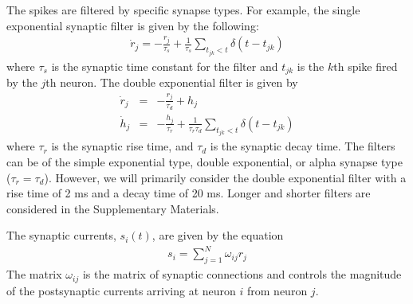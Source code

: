 \documentclass[11pt]{article} %
\begin{document}
The spikes are filtered by specific synapse types.  For example, the single exponential synaptic filter is given by the following:
\begin{eqnarray}
\dot{r}_j = -\frac{r_j}{\tau_s} + \frac{1}{\tau_s}\sum_{t_{jk}<t}\delta(t-t_{jk})  \label{fr11}
\end{eqnarray}
where $\tau_s$ is the synaptic time constant for the filter and $t_{jk}$ is the $k$th spike fired by the $j$th neuron.  The double exponential filter is given by 
\begin{eqnarray}
\dot{r}_j &=& -\frac{r_j}{\tau_d} + h_j \\
\dot{h}_j&=& -\frac{h_j}{\tau_r} + \frac{1}{\tau_r\tau_d} \sum_{t_{jk}<t}\delta(t-t_{jk})  \label{fr12}
\end{eqnarray}
where $\tau_r$ is the synaptic rise time, and $\tau_d$ is the synaptic decay time.    The filters can be of the simple exponential type, double exponential, or alpha synapse type ($\tau_r = \tau_d$).   However, we will primarily consider the double exponential filter with a rise time of 2 ms and a decay time of 20 ms.  Longer and shorter filters are considered in the Supplementary Materials.   

The synaptic currents, $s_i(t)$, are given by the equation 
\begin{eqnarray}
s_i = \sum_{j=1}^N  \omega_{ij}r_j 
\end{eqnarray} 
The matrix $\omega_{ij}$ is the matrix of synaptic connections and controls the magnitude of the postsynaptic currents arriving at neuron $i$ from neuron $j$.  
\end{document}
